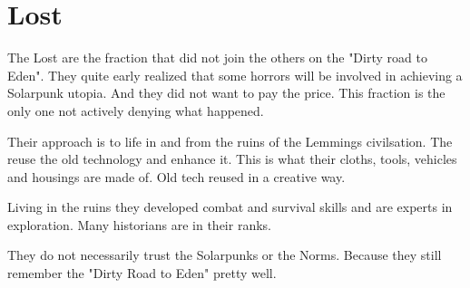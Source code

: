 \section{Lost}

The Lost are the fraction that did not join the others on the "Dirty road to Eden". They quite early realized that some horrors will be involved in achieving a Solarpunk utopia. And they did not want to pay the price. This fraction is the only one not actively denying what happened.

Their approach is to life in and from the ruins of the Lemmings civilsation. The reuse the old technology and enhance it. This is what their cloths, tools, vehicles and housings are made of. Old tech reused in a creative way.

Living in the ruins they developed combat and survival skills and are experts in exploration.
Many historians are in their ranks.

They do not necessarily trust the Solarpunks or the Norms. Because they still remember the "Dirty Road to Eden" pretty well.

